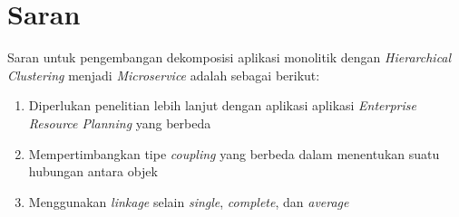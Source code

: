 \section{Saran}
Saran  untuk pengembangan dekomposisi aplikasi monolitik dengan \textit{Hierarchical Clustering} menjadi \textit{Microservice} adalah sebagai berikut:
\begin{enumerate}[nolistsep,leftmargin=0.5cm]
    \item  Diperlukan penelitian lebih lanjut dengan aplikasi aplikasi \textit{Enterprise Resource Planning} yang berbeda 
    \item  Mempertimbangkan tipe  \textit{coupling} yang berbeda dalam menentukan suatu hubungan antara objek
    \item  Menggunakan \textit{linkage} selain \textit{single}, \textit{complete}, dan \textit{average}
\end{enumerate}